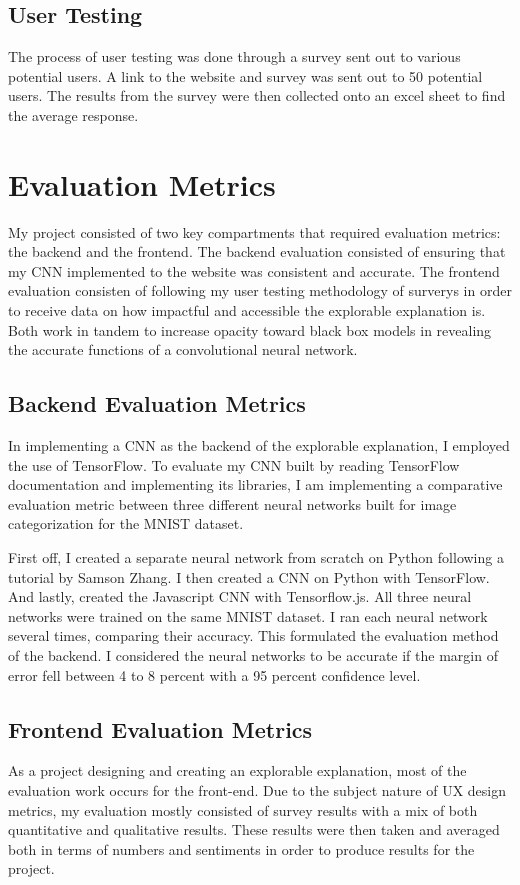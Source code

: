\documentclass[10pt,twocolumn]{article}
\begin{document}
\subsection{User Testing}
The process of user testing was done through a survey sent out to various potential users. A link to the website and survey was sent out to 50 potential users. The results from the survey were then collected onto an excel sheet to find the average response. 

\section{Evaluation Metrics}
My project consisted of two key compartments that required evaluation metrics: the backend and the frontend. The backend evaluation consisted of ensuring that my CNN implemented to the website was consistent and accurate. The frontend evaluation consisten of following my user testing methodology of surverys in order to receive data on how impactful and accessible the explorable explanation is. Both work in tandem to increase opacity toward black box models in revealing the accurate functions of a convolutional neural network. 

\subsection{Backend Evaluation Metrics}
In implementing a CNN as the backend of the explorable explanation, I employed the use of TensorFlow. To evaluate my CNN built by reading TensorFlow documentation and implementing its libraries, I am implementing a comparative evaluation metric between three different neural networks built for image categorization for the MNIST dataset.


First off, I created a separate neural network from scratch on Python following a tutorial by Samson Zhang. \cite{pythonCNNScratch} I then created a CNN on Python with TensorFlow. And lastly, created the Javascript CNN with Tensorflow.js. All three neural networks were trained on the same MNIST dataset. I ran each neural network several times, comparing their accuracy. This formulated the evaluation method of the backend. I considered the neural networks to be accurate if the margin of error fell between 4 to 8 percent with a 95 percent confidence level. \cite{tensorflow2015-whitepaper}

\subsection{Frontend Evaluation Metrics}
As a project designing and creating an explorable explanation, most of the evaluation work occurs for the front-end. Due to the subject nature of UX design metrics, my evaluation mostly consisted of survey results with a mix of both quantitative and qualitative results. These results were then taken and averaged both in terms of numbers and sentiments in order to produce results for the project. 
\end{document}
